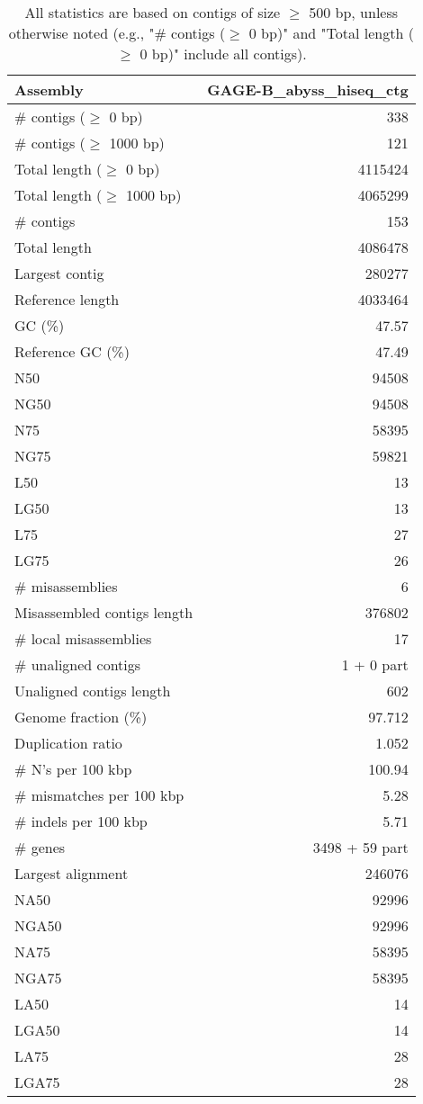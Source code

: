 \documentclass[12pt,a4paper]{article}
\begin{document}
\begin{table}[ht]
\begin{center}
\caption{All statistics are based on contigs of size $\geq$ 500 bp, unless otherwise noted (e.g., "\# contigs ($\geq$ 0 bp)" and "Total length ($\geq$ 0 bp)" include all contigs).}
\begin{tabular}{|l*{1}{|r}|}
\hline
Assembly & GAGE-B\_abyss\_hiseq\_ctg \\ \hline
\# contigs ($\geq$ 0 bp) & 338 \\ \hline
\# contigs ($\geq$ 1000 bp) & 121 \\ \hline
Total length ($\geq$ 0 bp) & 4115424 \\ \hline
Total length ($\geq$ 1000 bp) & 4065299 \\ \hline
\# contigs & 153 \\ \hline
Total length & 4086478 \\ \hline
Largest contig & 280277 \\ \hline
Reference length & 4033464 \\ \hline
GC (\%) & 47.57 \\ \hline
Reference GC (\%) & 47.49 \\ \hline
N50 & 94508 \\ \hline
NG50 & 94508 \\ \hline
N75 & 58395 \\ \hline
NG75 & 59821 \\ \hline
L50 & 13 \\ \hline
LG50 & 13 \\ \hline
L75 & 27 \\ \hline
LG75 & 26 \\ \hline
\# misassemblies & 6 \\ \hline
Misassembled contigs length & 376802 \\ \hline
\# local misassemblies & 17 \\ \hline
\# unaligned contigs & 1 + 0 part \\ \hline
Unaligned contigs length & 602 \\ \hline
Genome fraction (\%) & 97.712 \\ \hline
Duplication ratio & 1.052 \\ \hline
\# N's per 100 kbp & 100.94 \\ \hline
\# mismatches per 100 kbp & 5.28 \\ \hline
\# indels per 100 kbp & 5.71 \\ \hline
\# genes & 3498 + 59 part \\ \hline
Largest alignment & 246076 \\ \hline
NA50 & 92996 \\ \hline
NGA50 & 92996 \\ \hline
NA75 & 58395 \\ \hline
NGA75 & 58395 \\ \hline
LA50 & 14 \\ \hline
LGA50 & 14 \\ \hline
LA75 & 28 \\ \hline
LGA75 & 28 \\ \hline
\end{tabular}
\end{center}
\end{table}
\end{document}

